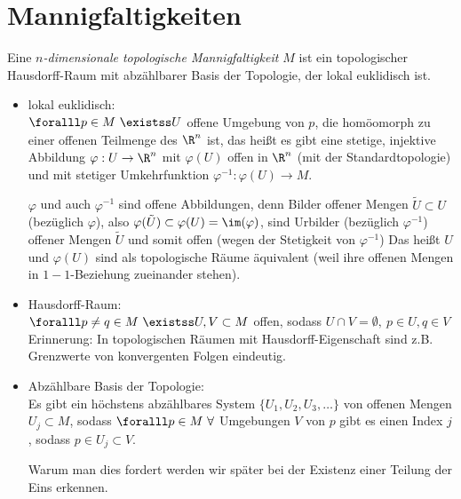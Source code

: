 \chapter{Mannigfaltigkeiten}\lecture

\begin{defn}\label{def1_1}
	Eine \emph{$n$-dimensionale topologische Mannigfaltigkeit $M$} ist ein topologischer Hausdorff-Raum mit abzählbarer Basis der Topologie, der lokal euklidisch ist.
	\begin{itemize}
		\item lokal euklidisch:\\
			$ \foralll p \in M\ \existss U $ offene Umgebung von $p$, die homöomorph zu einer offenen Teilmenge des $\R^n$ ist, das heißt es gibt eine stetige, injektive Abbildung $ \varphi: U \to \R^n $ mit $ \varphi(U) $ offen in $\R^n$ (mit der Standardtopologie) und mit stetiger Umkehrfunktion $\varphi^{-1}: \varphi(U) \to M$.
			\begin{rem*}
				$\varphi$ und auch $\varphi^{-1}$ sind offene Abbildungen, denn Bilder offener Mengen $ \tilde{U} \subset U $ (bezüglich $\varphi$), also $ \varphi(\tilde{U}) \subset \varphi(U) = \im(\varphi) $, sind Urbilder (bezüglich $\varphi^{-1}$) offener Mengen $\tilde{U}$ und somit offen (wegen der Stetigkeit von $\varphi^{-1}$)
				Das heißt $U$ und $\varphi(U)$ sind als topologische Räume äquivalent (weil ihre offenen Mengen in $1-1$-Beziehung zueinander stehen).
			\end{rem*}
		\item Hausdorff-Raum:\\
			$ \foralll p \neq q \in M \ \existss U,V \subset M $ offen, sodass $ U \cap V = \emptyset,\ p \in U, q \in V $
			\image{1_1 hausdorff}{6cm}
			Erinnerung: In topologischen Räumen mit Hausdorff-Eigenschaft sind z.B. Grenzwerte von konvergenten Folgen eindeutig.
		\item Abzählbare Basis der Topologie:\\
			Es gibt ein höchstens abzählbares System $ \{U_1,U_2,U_3,\dots\} $ von offenen Mengen $ U_j \subset M $, sodass $ \foralll p \in M \ \forall $ Umgebungen $V$ von $p$ gibt es einen Index $j$, sodass $ p \in U_j \subset V $.
			\begin{rem*}
				Warum man dies fordert werden wir später bei der Existenz einer Teilung der Eins erkennen.
			\end{rem*}
	\end{itemize}

\end{defn}
